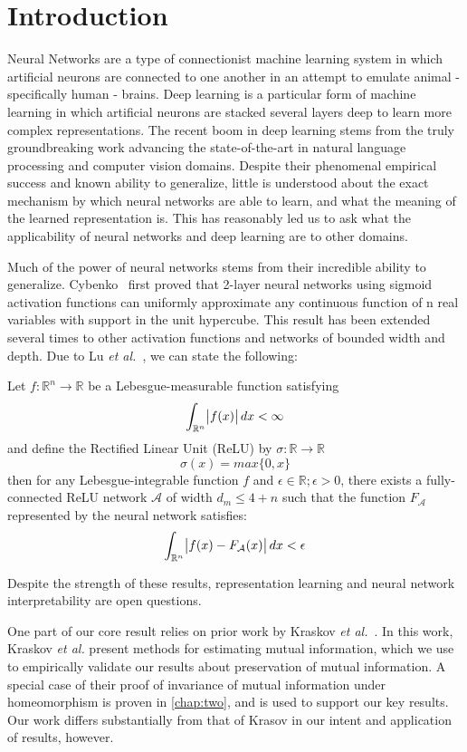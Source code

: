 \chapter{Introduction}
\label{chap:intro}

\label{intro:nn}
Neural Networks are a type of connectionist machine learning system in which artificial neurons are connected to one another in an attempt to emulate animal - specifically human - brains.
Deep learning is a particular form of machine learning in which artificial neurons are stacked several layers deep to learn more complex representations. 
The recent boom in deep learning stems from the truly groundbreaking work advancing the state-of-the-art in natural language processing and computer vision domains.
Despite their phenomenal empirical success and known ability to generalize, little is understood about the exact mechanism by which neural networks are able to learn, and what the meaning of the learned representation is.
This has reasonably led us to ask what the applicability of neural networks and deep learning are to other domains.

Much of the power of neural networks stems from their incredible ability to generalize.
Cybenko~\cite{cybenko1989approximation} first proved that 2-layer neural networks using sigmoid activation functions can uniformly approximate any continuous function of n real variables with support in the unit hypercube.
This result has been extended several times to other activation functions and networks of bounded width and depth. 
Due to Lu \textit{et al.}~\cite{lu2017expressive}, we can state the following:

\begin{theorem}
Let $f: \mathbb{R}^n \to \mathbb{R}$ be a Lebesgue-measurable function satisfying
$$\int_{\mathbb{R}^n} \abs{f(x)} dx < \infty$$
and define the Rectified Linear Unit (ReLU) by $\sigma: \mathbb{R} \to \mathbb{R}$ 
$$\sigma(x) = max\{0, x\}$$
then for any Lebesgue-integrable function $f$ and $\epsilon \in \mathbb{R}; \epsilon > 0$, there exists a fully-connected ReLU network $\mathcal{A}$ of width $d_m \leq 4 + n$ such that the function $F_{\mathcal{A}}$ represented by the neural network satisfies:
$$\int_{\mathbb{R}^n} \abs{f(x) - F_{\mathcal{A}}(x)}dx < \epsilon$$
\end{theorem}

Despite the strength of these results, representation learning and neural network interpretability are open questions.


One part of our core result relies on prior work by Kraskov \textit{et al.}~\cite{kraskov2004estimating}. 
In this work, Kraskov \textit{et al.} present methods for estimating mutual information, which we use to empirically validate our results about preservation of mutual information.
A special case of their proof of invariance of mutual information under homeomorphism is proven in \ref{chap:two}, and is used to support our key results.
Our work differs substantially from that of Krasov in our intent and application of results, however.

